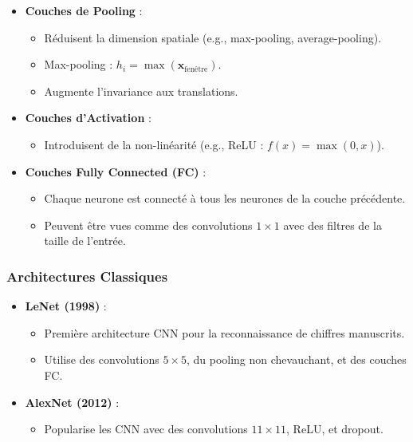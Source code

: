 \documentclass[a4paper,portrait]{article}
\begin{document}
\begin{multicols}{2}
\begin{itemize}
    \item \textbf{Couches de Pooling} :
    \begin{itemize}
        \item Réduisent la dimension spatiale (e.g., max-pooling, average-pooling).
        \item Max-pooling : \( h_i = \max(\mathbf{x}_{\text{fenêtre}}) \).
        \item Augmente l'invariance aux translations.
    \end{itemize}

    \item \textbf{Couches d'Activation} :
    \begin{itemize}
        \item Introduisent de la non-linéarité (e.g., ReLU : \( f(x) = \max(0, x) \)).
    \end{itemize}

    \item \textbf{Couches Fully Connected (FC)} :
    \begin{itemize}
        \item Chaque neurone est connecté à tous les neurones de la couche précédente.
        \item Peuvent être vues comme des convolutions \( 1 \times 1 \) avec des filtres de la taille de l'entrée.
    \end{itemize}
\end{itemize}



\subsubsection{Architectures Classiques}

\begin{itemize}
    \item \textbf{LeNet (1998)} :
    \begin{itemize}
        \item Première architecture CNN pour la reconnaissance de chiffres manuscrits.
        \item Utilise des convolutions \( 5 \times 5 \), du pooling non chevauchant, et des couches FC.
    \end{itemize}

    \item \textbf{AlexNet (2012)} :
    \begin{itemize}
        \item Popularise les CNN avec des convolutions \( 11 \times 11 \), ReLU, et dropout.
    \end{itemize}


\end{itemize}
\end{multicols}
\end{document}

